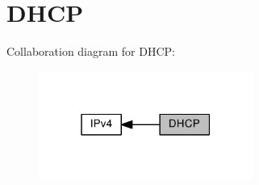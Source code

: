 \hypertarget{group__lwip__opts__dhcp}{}\section{D\+H\+CP}
\label{group__lwip__opts__dhcp}
Collaboration diagram for D\+H\+CP\+:
\nopagebreak
\begin{figure}[H]
\begin{center}
\leavevmode
\includegraphics[width=199pt]{group__lwip__opts__dhcp}
\end{center}
\end{figure}
